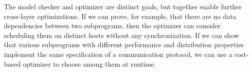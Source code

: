 
The model checker and optimizer are distinct goals, but together enable further
cross-layer optimizations.  If we can prove, for example, that there are no data
dependencies between two subprograms, then the optimizer can consider scheduling
them on distinct hosts without any synchronization.  If we can show that various
subprograms with different performance and distribution properties implement the
same specification of a communication protocol, we can use a cost-based
optimizer to choose among them at runtime.
